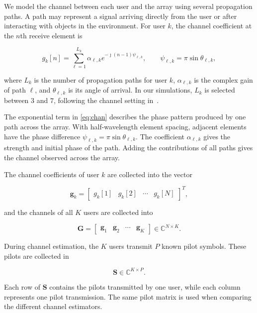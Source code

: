\documentclass[journal]{IEEEtran}
\newcommand{\bG}{\mathbf{G}}
\newcommand{\bS}{\mathbf{S}}
\newcommand{\bg}{\mathbf{g}}
\begin{document}
We model the channel between each user and the array using several
propagation paths. A path may represent a signal arriving directly from the
user or after interacting with objects in the environment. For user $k$,
the channel coefficient at the $n$th receive element is

\begin{equation}
g_k[n]
=
\sum_{\ell=1}^{L_k}
\alpha_{\ell,k}
e^{-\jmath(n-1)\psi_{\ell,k}},
\qquad
\psi_{\ell,k}
=
\pi\sin\theta_{\ell,k},
\label{eq:chan}
\end{equation}

where $L_k$ is the number of propagation paths for user $k$,
$\alpha_{\ell,k}$ is the complex gain of path $\ell$, and
$\theta_{\ell,k}$ is its angle of arrival. In our simulations,
$L_k$ is selected between $3$ and $7$, following the channel setting
in~\cite{xu2025}.

The exponential term in \eqref{eq:chan} describes the phase pattern produced
by one path across the array. With half-wavelength element spacing, adjacent
elements have the phase difference $\psi_{\ell,k}=\pi\sin\theta_{\ell,k}$.
The coefficient $\alpha_{\ell,k}$ gives the strength and initial phase of the
path. Adding the contributions of all paths gives the channel observed across
the array.

The channel coefficients of user $k$ are collected into the vector

\begin{equation}
\bg_k
=
\begin{bmatrix}
g_k[1] &
g_k[2] &
\cdots &
g_k[N]
\end{bmatrix}^{T},
\end{equation}

and the channels of all $K$ users are collected into

\begin{equation}
\bG
=
\begin{bmatrix}
\bg_1 &
\bg_2 &
\cdots &
\bg_K
\end{bmatrix}
\in\mathbb{C}^{N\times K}.
\end{equation}

During channel estimation, the $K$ users transmit $P$ known pilot symbols.
These pilots are collected in

\begin{equation}
\bS
\in
\mathbb{C}^{K\times P}.
\end{equation}

Each row of $\bS$ contains the pilots transmitted by one user, while each
column represents one pilot transmission. The same pilot matrix is used
when comparing the different channel estimators.
\end{document}
